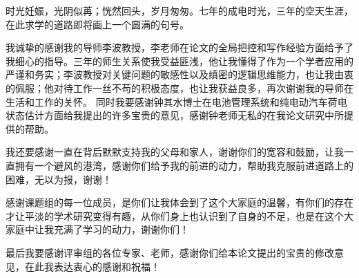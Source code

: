 
时光妊娠，光阴似苒；恍然回头，岁月匆匆。七年的成电时光，三年的空天生涯，在此求学的道路即将画上一个圆满的句号。

我诚挚的感谢我的导师李波教授，李老师在论文的全局把控和写作经验方面给予了我细心的指导。三年的师生关系使我受益匪浅，他让我懂得了作为一个学者应用的严谨和务实；李波教授对关键问题的敏感性以及缜密的逻辑思维能力，也让我由衷的佩服；他对待工作一丝不苟的积极态度，也让我获益良多，再次谢谢我的导师在生活和工作的关怀。
同时我要感谢钟其水博士在电池管理系统和纯电动汽车荷电状态估计方面给我提出的许多宝贵的意见，感谢钟老师无私的在我论文研究中所提供的帮助。

我还要感谢一直在背后默默支持我的父母和家人，谢谢你们的宽容和鼓励，让我一直拥有一个避风的港湾，感谢你们给予我的前进的动力，帮助我克服前进道路上的困难，无以为报，谢谢！

感谢课题组的每一位成员，是你们让我体会到了这个大家庭的温馨，有你们的存在才让平淡的学术研究变得有趣，从你们身上也认识到了自身的不足，也是在这个大家庭中让我充满了学习的动力，谢谢你们！ 

最后我要感谢评审组的各位专家、老师，感谢你们给本论文提出的宝贵的修改意见，在此我表达衷心的感谢和祝福！

